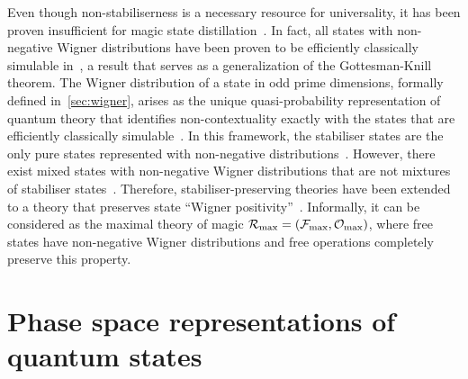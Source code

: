 \documentclass[pra,
aps,
twocolumn,
superscriptaddress,
groupedaddress,
nofootinbib,
reprint
]{revtex4-1}
\begin{document}
Even though non-stabiliserness is a necessary resource for universality, it has been proven insufficient for magic state distillation~\cite{cit:bravyi, cit:campbell}.
In fact, all states with non-negative Wigner distributions have been proven to be efficiently classically simulable in~\cite{cit:mari}, a result that serves as a generalization of the Gottesman-Knill theorem.
The Wigner distribution of a state in odd prime dimensions, formally defined in~\cref{sec:wigner}, arises as the unique quasi-probability representation of quantum theory that identifies non-contextuality exactly with the states that are efficiently classically simulable~\cite{Delfosse_2017, cit:howard2, cit:veitch2}.
In this framework, the stabiliser states are the only pure states represented with non-negative distributions~\cite{cit:gross3}. 
However, there exist mixed states with non-negative Wigner distributions that are not mixtures of stabiliser states~\cite{cit:gross}.
Therefore, stabiliser-preserving theories have been extended to a theory that preserves state ``Wigner positivity''~\cite{Wang_2019}.
Informally, it can be considered as the maximal theory of magic $\mathcal{R}_{\rm{max}} = (\mathcal{F}_{\rm{max}}, \mathcal{O}_{\rm{max}})$, where free states have non-negative Wigner distributions and free operations completely preserve this property.\\ 


\newpage
\section{Phase space representations of quantum states}
\label{sec:ps}
\end{document}
